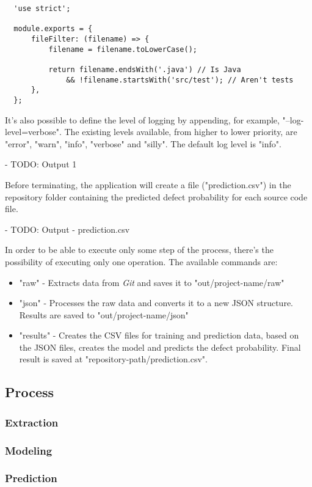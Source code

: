 \begin{lstlisting}
  'use strict';

  module.exports = {
      fileFilter: (filename) => {
          filename = filename.toLowerCase();

          return filename.endsWith('.java') // Is Java
              && !filename.startsWith('src/test'); // Aren't tests
      },
  };
\end{lstlisting}

It's also possible to define the level of logging by appending, for example, "--log-level=verbose". The existing levels available, from higher to lower priority, are
"error", "warn", "info", "verbose" and "silly". The default log level is "info".

- TODO: Output 1

Before terminating, the application will create a file ("prediction.csv") in the repository folder containing the predicted defect probability for each source code file.

- TODO: Output - prediction.csv

In order to be able to execute only some step of the process, there's the possibility of executing only one operation. The available commands are:
%
\begin{itemize}
\item "raw" - Extracts data from \emph{Git} and saves it to "out/{project-name}/raw"
\item "json" - Processes the raw data and converts it to a new JSON structure. Results are saved to "out/{project-name}/json"
\item "results" - Creates the CSV files for training and prediction data, based on the JSON files, creates the model and predicts the defect probability.
Final result is saved at "{repository-path}/prediction.csv".
\end{itemize}

\subsection{Process}

\subsubsection{Extraction}

\subsubsection{Modeling}

\subsubsection{Prediction}
